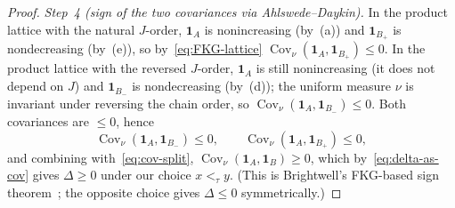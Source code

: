 \begin{proof}
\emph{Step~4 (sign of the two covariances via
Ahlswede--Daykin).} In the product lattice with the natural
$J$-order, $\mathbf{1}_A$ is nonincreasing (by~(a)) and
$\mathbf{1}_{B_+}$ is nondecreasing (by~(e)), so
by~\eqref{eq:FKG-lattice}
$\operatorname{Cov}_\nu(\mathbf{1}_A, \mathbf{1}_{B_+}) \le 0$.
In the product lattice with the reversed $J$-order,
$\mathbf{1}_A$ is still nonincreasing (it does not depend on $J$)
and $\mathbf{1}_{B_-}$ is nondecreasing (by~(d)); the uniform
measure $\nu$ is invariant under reversing the chain order, so
$\operatorname{Cov}_\nu(\mathbf{1}_A, \mathbf{1}_{B_-}) \le 0$.
Both covariances are $\le 0$, hence
\begin{equation}\label{eq:AD-signs}
  \operatorname{Cov}_\nu(\mathbf{1}_A, \mathbf{1}_{B_-}) \le 0,
  \qquad
  \operatorname{Cov}_\nu(\mathbf{1}_A, \mathbf{1}_{B_+}) \le 0,
\end{equation}
and combining with~\eqref{eq:cov-split},
$\operatorname{Cov}_\nu(\mathbf{1}_A, \mathbf{1}_B) \ge 0$, which
by~\eqref{eq:delta-as-cov} gives $\Delta \ge 0$ under our choice
$x <_\tau y$. (This is Brightwell's FKG-based sign
theorem~\cite[\S4]{Brightwell1999}; the opposite choice gives
$\Delta \le 0$ symmetrically.)


\end{proof}
